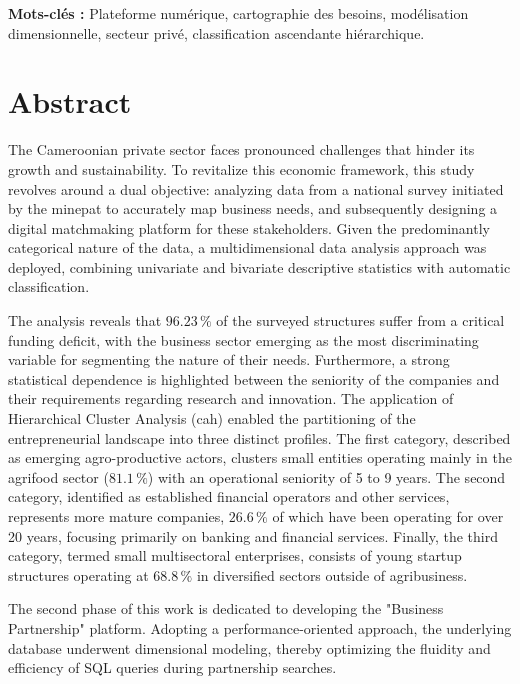 \documentclass[12pt, a4paper, oneside]{report}
\begin{document}
\vspace{0.5cm}
\noindent \textbf{Mots-clés :} Plateforme numérique, cartographie des besoins, modélisation dimensionnelle, secteur privé, classification ascendante hiérarchique.
	
	\vspace{1cm}

	\chapter*{Abstract}
	\thispagestyle{plain}
	The Cameroonian private sector faces pronounced challenges that hinder its growth and sustainability. To revitalize this economic framework, this study revolves around a dual objective: analyzing data from a national survey initiated by the \gls{minepat} to accurately map business needs, and subsequently designing a digital matchmaking platform for these stakeholders. Given the predominantly categorical nature of the data, a multidimensional data analysis approach was deployed, combining univariate and bivariate descriptive statistics with automatic classification.
	
	The analysis reveals that $96.23\,\%$ of the surveyed structures suffer from a critical funding deficit, with the business sector emerging as the most discriminating variable for segmenting the nature of their needs. Furthermore, a strong statistical dependence is highlighted between the seniority of the companies and their requirements regarding research and innovation. The application of Hierarchical Cluster Analysis (\gls{cah}) enabled the partitioning of the entrepreneurial landscape into three distinct profiles. The first category, described as emerging agro-productive actors, clusters small entities operating mainly in the agrifood sector ($81.1\,\%$) with an operational seniority of 5 to 9 years. The second category, identified as established financial operators and other services, represents more mature companies, $26.6\,\%$ of which have been operating for over 20 years, focusing primarily on banking and financial services. Finally, the third category, termed small multisectoral enterprises, consists of young startup structures operating at $68.8\,\%$ in diversified sectors outside of agribusiness.
	
	The second phase of this work is dedicated to developing the "Business Partnership" platform. Adopting a performance-oriented approach, the underlying database underwent dimensional modeling, thereby optimizing the fluidity and efficiency of SQL queries during partnership searches.
	
\end{document}

